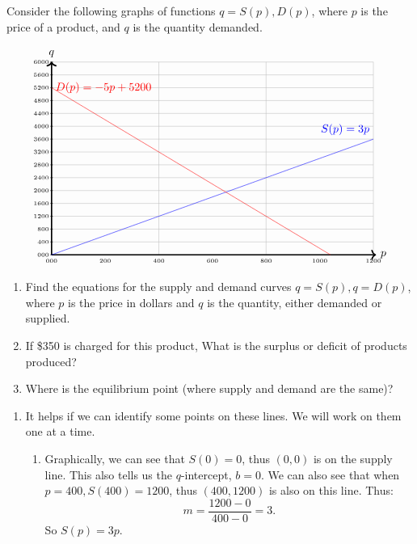 \begin{example}\label{Example:}
\Q Consider the following graphs of functions $q=S(p), D(p)$, where $p$ is the price of a product, and $q$ is the quantity demanded.

$$\begin{tikzpicture}[yscale=6/60, xscale=10/12]
    \draw[gray!50, thin, step=4] (0,0) grid (12,60);
    \draw[very thick,->] (0,0) -- (12.1,0) node[right] {$p$};
    \draw[very thick,->] (0,0) -- (0,60.1) node[above] {$q$};

    \foreach \x in {0,2,...,12} \draw (\x,0.05) -- (\x,-0.05) node[below] {\tiny\x00};
    \foreach \y in {0,4,...,60} \draw (-0.05,\y) -- (0.05,\y) node[left] {\tiny\y00};



    \draw[scale=1,domain=0:12,smooth,variable=\x,blue] plot ({\x},{3*\x});

    \draw[scale=1,domain=0:10.4,smooth,variable=\x,red] plot ({\x},{-5*\x+52});

\draw[red] (0,52) --node[right]{$D(p)=-5p+5200$}(0,52);
\draw[blue] (12,36) --node[above left]{$S(p)=3p$}(12,36);



\end{tikzpicture}$$

\begin{enumerate}
    \item Find the equations for the supply and demand curves $q=S(p), q=D(p)$, where $p$ is the price in dollars and $q$ is the quantity, either demanded or supplied.
    \item If \$350 is charged for this product, What is the surplus or deficit of products produced?
    \item Where is the equilibrium point (where supply and demand are the same)?
\end{enumerate}

\Sol

\begin{enumerate}
    \item It helps if we can identify some points on these lines.  We will work on them one at a time.
    \begin{enumerate}
        \item Graphically, we can see that $S(0)=0$, thus $(0,0)$ is on the supply line.  This also tells us the $q$-intercept, $b=0$.  We can also see that when $p=400, S(400)=1200$, thus $(400,1200)$ is also on this line.  Thus: $$m=\frac{1200-0}{400-0}=3.$$  So $S(p)=3p$.
        

\end{enumerate}
\end{enumerate}
\end{example}
